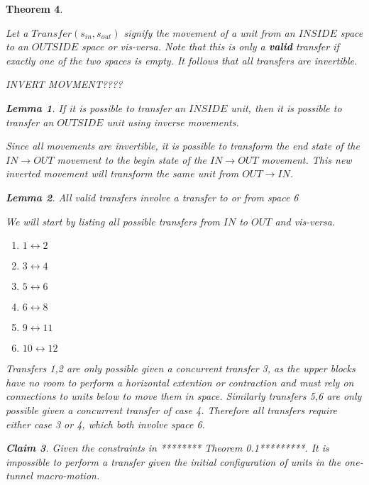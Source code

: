 \documentclass[12pt]{article}
\newtheorem{theorem}{Theorem}[section]
\newtheorem{claim}[theorem]{Claim}
\newtheorem{lemma}[theorem]{Lemma}
\newenvironment{proof}[1][Proof]{\begin{trivlist}
\item[\hskip \labelsep {\bfseries #1}]}{\end{trivlist}}
\newenvironment{definition}[1][Definition]{\begin{trivlist}
\item[\hskip \labelsep {\bfseries #1}]}{\end{trivlist}}
\begin{document}
\begin{theorem}
\begin{definition} Let a $Transfer(s_{in}, s_{out})$ signify the movement of a unit from an $INSIDE$ space to an $OUTSIDE$ space or vis-versa. Note that this is only a \textbf{valid} transfer if exactly one of the two spaces is empty. It follows that all transfers are invertible. 
\end{definition}
\begin{definition}
INVERT MOVMENT????
\end{definition}
\begin{lemma} If it is possible to transfer an $INSIDE$ unit, then it is possible to transfer an $OUTSIDE$ unit using inverse movements.
\end{lemma}
\begin{proof}
Since all movements are invertible, it is possible to transform the end state of the $IN \rightarrow OUT$ movement to the begin state of the $IN \rightarrow OUT$ movement. This new inverted movement will transform the same unit from $OUT \rightarrow IN$.
\end{proof}
\begin{lemma} All valid transfers involve a transfer to or from space 6
\end{lemma}
\begin{proof}
We will start by listing all possible transfers from $IN$ to $OUT$ and vis-versa.
\begin{enumerate}
\item $1 \leftrightarrow 2$
\item $3 \leftrightarrow 4$
\item $5 \leftrightarrow 6$
\item $6 \leftrightarrow 8$
\item $9 \leftrightarrow 11$
\item $10 \leftrightarrow 12$
\end{enumerate}
Transfers 1,2 are only possible given a concurrent transfer 3, as the upper blocks have no room to perform a horizontal extention or contraction and must rely on connections to units below to move them in space. Similarly transfers 5,6 are only possible given a concurrent transfer of case 4. Therefore all transfers require either case 3 or 4, which both involve space 6.
\end{proof}
\begin{claim} Given the constraints in ******** Theorem 0.1*********. It is impossible to perform a transfer given the initial configuration of units in the one-tunnel macro-motion.


\end{claim}
\end{theorem}
\end{document}
